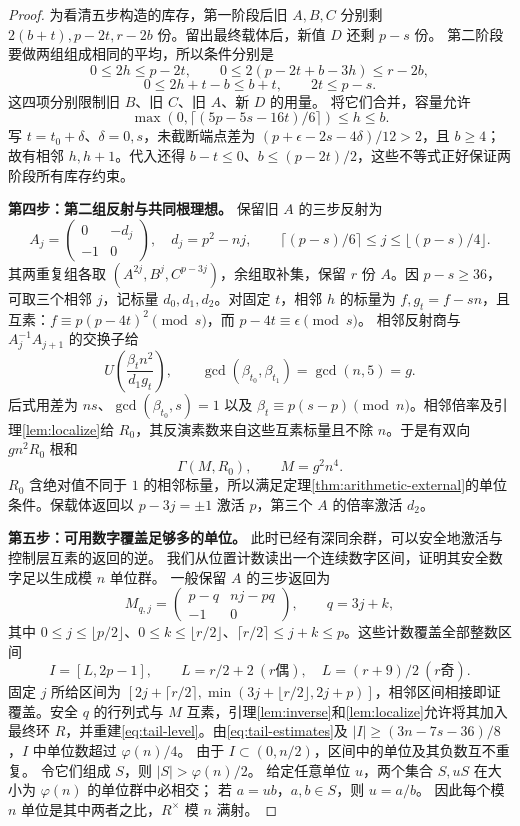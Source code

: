 \begin{proof}
为看清五步构造的库存，第一阶段后旧 $A,B,C$ 分别剩
$2(b+t),p-2t,r-2b$ 份。留出最终载体后，新值 $D$ 还剩 $p-s$ 份。
第二阶段要做两组组成相同的平均，所以条件分别是
\[
0\le2h\le p-2t,\qquad
0\le2(p-2t+b-3h)\le r-2b,
\]
\[
0\le2h+t-b\le b+t,\qquad 2t\le p-s.
\]
这四项分别限制旧 $B$、旧 $C$、旧 $A$、新 $D$ 的用量。
将它们合并，容量允许
\[
\max(0,\lceil(5p-5s-16t)/6\rceil)\le h\le b.
\]
写 $t=t_0+\delta$、$\delta=0,s$，未截断端点差为 $(p+\epsilon-2s-4\delta)/12>2$，且 $b\ge4$；故有相邻 $h,h+1$。代入还得 $b-t\le0$、$b\le(p-2t)/2$，这些不等式正好保证两阶段所有库存约束。


\par\noindent\textbf{第四步：第二组反射与共同根理想。}
保留旧 $A$ 的三步反射为
\[
A_j=\begin{pmatrix}0&-d_j\\-1&0\end{pmatrix},\quad d_j=p^2-nj,\qquad
\lceil(p-s)/6\rceil\le j\le\lfloor(p-s)/4\rfloor.
\]
其两重复组各取 $(A^{2j},B^j,C^{p-3j})$，余组取补集，保留 $r$ 份 $A$。因 $p-s\ge36$，可取三个相邻 $j$，记标量 $d_0,d_1,d_2$。对固定 $t$，相邻 $h$ 的标量为 $f,g_t=f-sn$，且互素：$f\equiv p(p-4t)^2\pmod s$，而 $p-4t\equiv\epsilon\pmod s$。
相邻反射商与 $A_j^{-1}A_{j+1}$ 的交换子给
\[
U\left(\frac{\beta_t n^2}{d_1g_t}\right),\qquad
\gcd(\beta_{t_0},\beta_{t_1})=\gcd(n,5)=g.
\]
后式用差为 $ns$、$\gcd(\beta_{t_0},s)=1$ 以及 $\beta_t\equiv p(s-p)\pmod n$。相邻倍率及引理\ref{lem:localize}给 $R_0$，其反演素数来自这些互素标量且不除 $n$。于是有双向 $gn^2R_0$ 根和
\begin{equation}\label{eq:tail-level}
\Gamma(M,R_0),\qquad M=g^2n^4.
\end{equation}
$R_0$ 含绝对值不同于 $1$ 的相邻标量，所以满足定理\ref{thm:arithmetic-external}的单位条件。保载体返回以 $p-3j=\pm1$ 激活 $p$，第三个 $A$ 的倍率激活 $d_2$。


\par\noindent\textbf{第五步：可用数字覆盖足够多的单位。}
此时已经有深同余群，可以安全地激活与控制层互素的返回的逆。
我们从位置计数读出一个连续数字区间，证明其安全数字足以生成模 $n$ 单位群。
一般保留 $A$ 的三步返回为
\[
M_{q,j}=\begin{pmatrix}p-q&nj-pq\\-1&0\end{pmatrix},\qquad q=3j+k,
\]
其中 $0\le j\le\lfloor p/2\rfloor$、$0\le k\le\lfloor r/2\rfloor$、$\lceil r/2\rceil\le j+k\le p$。这些计数覆盖全部整数区间
\[
I=[L,2p-1],\qquad L=r/2+2\ (r\text{偶}),\quad L=(r+9)/2\ (r\text{奇}).
\]
固定 $j$ 所给区间为 $[2j+\lceil r/2\rceil,\min(3j+\lfloor r/2\rfloor,2j+p)]$，相邻区间相接即证覆盖。安全 $q$ 的行列式与 $M$ 互素，引理\ref{lem:inverse}和\ref{lem:localize}允许将其加入最终环 $R$，并重建\eqref{eq:tail-level}。由\eqref{eq:tail-estimates}及 $|I|\ge(3n-7s-36)/8$，$I$ 中单位数超过 $\varphi(n)/4$。
由于 $I\subset(0,n/2)$，区间中的单位及其负数互不重复。
令它们组成 $S$，则 $|S|>\varphi(n)/2$。
给定任意单位 $u$，两个集合 $S,uS$ 在大小为 $\varphi(n)$ 的单位群中必相交；
若 $a=ub$，$a,b\in S$，则 $u=a/b$。
因此每个模 $n$ 单位是其中两者之比，$R^\times$ 模 $n$ 满射。



\end{proof}
